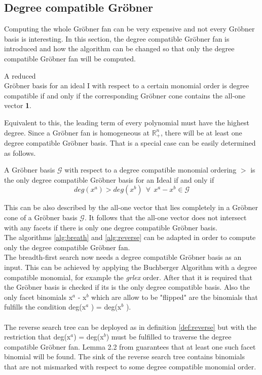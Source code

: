 \subsection{Degree compatible Gröbner}
\label{subsec:degreecomp}
Computing the whole Gröbner fan can be very expensive and not every Gröbner basis is interesting.
In this section, the degree compatible Gröbner fan is introduced and how the algorithm can
be changed so that only the degree compatible Gröbner fan will be computed.\\
\begin{env_definition}
\cite{dueckpaper}
A reduced \\ Gröbner basis for an ideal I with respect to a certain monomial order is
degree compatible if and only if the corresponding Gröbner cone contains the all-one vector \textbf{1}.
\end{env_definition}
Equivalent to this, the leading term of every polynomial must have the highest degree.
Since a Gröbner fan is homogeneous at $\mathbb{R}^{n}_{+}$, there will be at least one degree compatible Gröbner basis.
That is a special case can be easily determined as follows.

\begin{env_definition}
\cite{dueckpaper}
A Gröbner basis $\mathcal{G}$ with respect to a degree compatible monomial ordering $>$  is the only degree compatible Gröbner basis for an Ideal if and only if
\[ deg(x^{a}) > deg(x^{b})~~ \forall~~ x^{a}-x^{b}\in \mathcal{G} \] 
\end{env_definition}

This can be also described by the all-one vector that lies completely in a Gröbner cone of a Gröbner basis $\mathcal{G}$.
It follows that the all-one vector does not intersect with any facets if there is only one degree compatible Gröbner basis. \\

The algorithms \ref{alg:breath} and \ref{alg:reverse} can be adapted in order to compute only the degree compatible Gröbner fan.\\ 
The breadth-first search now needs a degree compatible Gröbner basis as an input. This can be achieved by applying the Buchberger Algorithm with a degree compatible monomial, for example the \textit{grlex} order. After that it is required that the Gröbner basis is checked if its is the only degree compatible basis. %
Also the only facet binomials x$^{a}$ - x$^{b}$ which are allow to be "flipped" are the binomials that fulfills the condition
deg(x$^{a}$ ) = deg(x$^{b} $ ). \\ \\
The reverse search tree can be deployed as in definition \ref{def:reverse} but with the restriction that deg(x$^{a}$) = deg(x$^{b}$) must be fulfilled to traverse the degree compatible Gröbner fan.
Lemma 2.2 from \cite{dueckpaper} guarantees that at least one such facet binomial will be found. 
The sink of the reverse search tree contains binomials that are not mismarked with respect to some degree compatible monomial order. 

